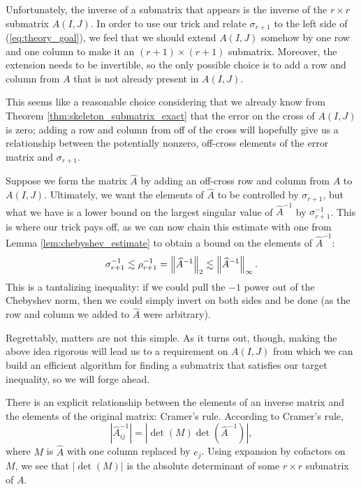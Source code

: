 \documentclass{article}
\begin{document}
	Unfortunately, the inverse of a submatrix that appears is the inverse of the $r\times r$ submatrix $A(I,J)$. In order to use our trick and relate $\sigma_{r+1}$ to the left side of (\ref{eq:theory_goal}), we feel that we should extend $A(I,J)$ somehow by one row and one column to make it an $(r+1)\times(r+1)$ submatrix. Moreover, the extension needs to be invertible, so the only possible choice is to add a row and column from $A$ that is not already present in $A(I,J)$.
	
	This seems like a reasonable choice considering that we already know from Theorem \ref{thm:skeleton_submatrix_exact} that the error on the cross of $A(I,J)$ is zero; adding a row and column from off of the cross will hopefully give us a relationship between the potentially nonzero, off-cross elements of the error matrix and $\sigma_{r+1}$.
	
	Suppose we form the matrix $\widehat{A}$ by adding an off-cross row and column from $A$ to $A(I,J)$. Ultimately, we want the elements of $\widehat{A}$ to be controlled by $\sigma_{r+1}$, but what we have is a lower bound on the largest singular value of $\widehat{A}^{-1}$ by $\sigma_{r+1}^{-1}$. This is where our trick pays off, as we can now chain this estimate with one from Lemma \ref{lem:chebyshev_estimate} to obtain a bound on the elements of $\widehat{A}^{-1}$:
	\begin{equation}
		\label{eq:almost_there}
		\sigma_{r+1}^{-1} \lesssim \rho_{r+1}^{-1} = \left\lVert \widehat{A}^{-1} \right\rVert_2 \lesssim \left\lVert \widehat{A}^{-1} \right\rVert_\infty.
	\end{equation}
	This is a tantalizing inequality: if we could pull the $-1$ power out of the Chebyshev norm, then we could simply invert on both sides and be done (as the row and column we added to $\widehat{A}$ were arbitrary).
	
	Regrettably, matters are not this simple. As it turns out, though, making the above idea rigorous will lead us to a requirement on $A(I,J)$ from which we can build an efficient algorithm for finding a submatrix that satisfies our target inequality, so we will forge ahead.
	
	There is an explicit relationship between the elements of an inverse matrix and the elements of the original matrix: Cramer's rule. According to Cramer's rule,
	\begin{equation}
		\left|\widehat{A}^{-1}_{ij}\right| = \left|\det(M)\det\left(\widehat{A}^{-1}\right)\right|,
	\end{equation}
	where $M$ is $\widehat{A}$ with one column replaced by $e_j$. Using expansion by cofactors on $M$, we see that $|\det(M)|$ is the absolute determinant of some $r\times r$ submatrix of $A$.
	
\end{document}
